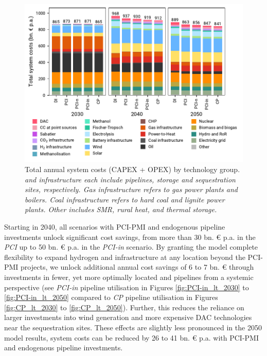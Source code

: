 \documentclass[final,5p,times,twocolumn,sort&compress]{elsarticle}
\begin{document}
\begin{figure}[htbp]
  \centering
  \includegraphics[width=\linewidth]{costs_overview.pdf}
  \caption{Total annual system costs (CAPEX + OPEX) by technology group. \textit{ and  infrastructure each include pipelines, storage and sequestration sites, respectively. Gas infrastructure refers to gas power plants and boilers. Coal infrastructure refers to hard coal and lignite power plants. Other includes SMR, rural heat, and thermal storage.}}
  \label{fig:costs_overview}
\end{figure}

Starting in 2040, all scenarios with PCI-PMI and endogenous pipeline investments unlock significant cost savings, from more than 30 bn. \euro{} p.a. in the \textit{PCI} up to 50 bn. \euro{} p.a. in the \textit{PCI-in} scenario. 
By granting the model complete flexibility to expand hydrogen and  infrastructure at any location beyond the PCI-PMI projects, we unlock additional annual cost savings of 6 to 7 bn. \euro{} through investments in fewer, yet more optimally located  and  pipelines from a systemic perspective (see \textit{PCI-in} pipeline utilisation in Figures \ref{fig:PCI-in_lt_2030} to \ref{fig:PCI-in_lt_2050} compared to \textit{CP} pipeline utilisation in Figures \ref{fig:CP_lt_2030} to \ref{fig:CP_lt_2050}).
Further, this reduces the reliance on larger investments into wind generation and more expensive DAC technologies near the sequestration sites. These effects are slightly less pronounced in the 2050 model results, system costs can be reduced by 26 to 41 bn. \euro{} p.a. with PCI-PMI and endogenous pipeline investments. 
\end{document}
